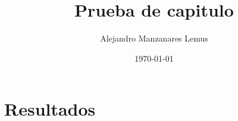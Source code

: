 \documentclass[xcolor=table]{article}
\title{Prueba de capitulo}
\author{Alejandro Manzanares Lemus}
\date{\today}
\begin{document}
\maketitle

\tableofcontents

\newpage








\section{Resultados}

\end{document}
